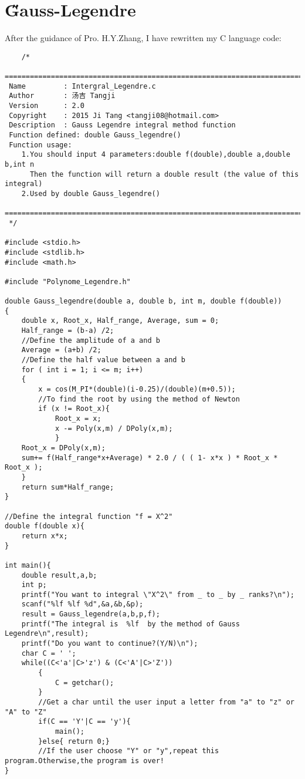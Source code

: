 \documentclass[12pt]{article}
\begin{document}
\section{\H Gauss-Legendre}
After the guidance of Pro. H.Y.Zhang, I have rewritten my C language code:
\begin{lstlisting}
	/*
 ============================================================================
 Name         : Intergral_Legendre.c
 Author       : 汤吉 Tangji
 Version      : 2.0
 Copyright    : 2015 Ji Tang <tangji08@hotmail.com>
 Description  : Gauss Legendre integral method function
 Function defined: double Gauss_legendre()
 Function usage:
    1.You should input 4 parameters:double f(double),double a,double b,int n
      Then the function will return a double result (the value of this integral)
    2.Used by double Gauss_legendre()
 ============================================================================
 */

#include <stdio.h>
#include <stdlib.h>
#include <math.h>

#include "Polynome_Legendre.h"

double Gauss_legendre(double a, double b, int m, double f(double))
{
    double x, Root_x, Half_range, Average, sum = 0;
    Half_range = (b-a) /2;
    //Define the amplitude of a and b
    Average = (a+b) /2;
    //Define the half value between a and b
    for ( int i = 1; i <= m; i++)
    {
	    x = cos(M_PI*(double)(i-0.25)/(double)(m+0.5));
	    //To find the root by using the method of Newton
	    if (x != Root_x){
		    Root_x = x;
		    x -= Poly(x,m) / DPoly(x,m);
	        }
	Root_x = DPoly(x,m);
    sum+= f(Half_range*x+Average) * 2.0 / ( ( 1- x*x ) * Root_x * Root_x );
    }
    return sum*Half_range;
}

//Define the integral function "f = X^2"
double f(double x){
	return x*x;
}

int main(){
	double result,a,b;
	int p;
	printf("You want to integral \"X^2\" from _ to _ by _ ranks?\n");
	scanf("%lf %lf %d",&a,&b,&p);
	result = Gauss_legendre(a,b,p,f);
	printf("The integral is  %lf  by the method of Gauss Legendre\n",result);
	printf("Do you want to continue?(Y/N)\n");
	char C = ' ';
	while((C<'a'|C>'z') & (C<'A'|C>'Z'))
		{
			C = getchar();
		}
		//Get a char until the user input a letter from "a" to "z" or "A" to "Z"
		if(C == 'Y'|C == 'y'){
			main();
		}else{ return 0;}
		//If the user choose "Y" or "y",repeat this program.Otherwise,the program is over!
}
\end{lstlisting}
\end{document}
